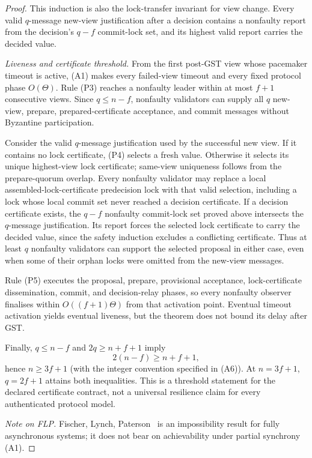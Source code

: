 \begin{proof}
This induction is also the lock-transfer invariant for view change. Every
valid \(q\)-message new-view justification after a decision contains a
nonfaulty report from the decision's \(q-f\) commit-lock set, and its highest
valid report carries the decided value.

\textit{Liveness and certificate threshold.}
From the first post-\textrm{GST} view whose pacemaker timeout is active,
(A1) makes every failed-view timeout and every fixed protocol phase
\(O(\Theta)\). Rule (P3) reaches a nonfaulty leader within at most \(f+1\)
consecutive views. Since \(q\le n-f\), nonfaulty validators can
supply all \(q\) new-view, prepare, prepared-certificate acceptance, and
commit messages without Byzantine participation.

Consider the valid \(q\)-message justification used by the successful new
view. If it contains no lock certificate, (P4) selects a fresh value.
Otherwise it selects its unique highest-view lock certificate; same-view
uniqueness follows from the prepare-quorum overlap. Every nonfaulty validator
may replace a local assembled-lock-certificate predecision lock with that
valid selection, including a
lock whose local commit set never reached a decision certificate. If a
decision certificate exists, the \(q-f\) nonfaulty commit-lock set proved
above intersects the \(q\)-message justification. Its report forces the
selected lock certificate to carry the decided value, since the safety
induction excludes a conflicting certificate. Thus at least \(q\) nonfaulty
validators can support the selected proposal in either case, even when some
of their orphan locks were omitted from the new-view messages.

Rule (P5) executes the proposal, prepare, provisional acceptance,
lock-certificate dissemination, commit, and decision-relay phases, so every
nonfaulty observer finalises within \(O((f+1)\Theta)\) from that activation
point. Eventual timeout activation yields eventual liveness, but the theorem
does not bound its delay after \textrm{GST}.

Finally, \(q\le n-f\) and \(2q\ge n+f+1\) imply
\[
 2(n-f)\ge n+f+1,
\]
hence \(n\ge3f+1\) (with the integer convention specified in (A6)).
At \(n=3f+1\), \(q=2f+1\) attains both inequalities. This is a threshold
statement for the declared certificate contract, not a universal resilience
claim for every authenticated protocol model.

\textit{Note on FLP.}
Fischer, Lynch, Paterson~\cite{FLP85} is an impossibility result for
fully asynchronous systems; it does not bear on achievability under
partial synchrony (A1).
\end{proof}

